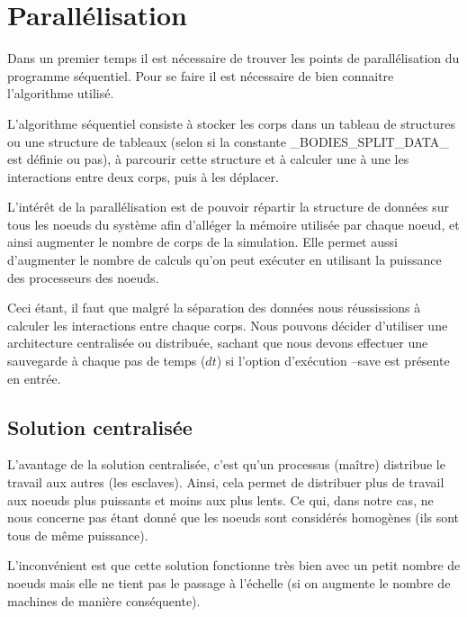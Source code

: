 \section{Parallélisation}

\par Dans un premier temps il est nécessaire de trouver les points de parallélisation 
du programme séquentiel. Pour se faire il est nécessaire de bien connaitre l'algorithme 
utilisé.\\
\par L'algorithme séquentiel consiste à stocker les corps dans un tableau de structures ou une structure 
de tableaux (selon si la constante \_BODIES\_SPLIT\_DATA\_ est définie ou pas), à parcourir 
cette structure et à calculer une à une les interactions entre deux corps, puis à les déplacer.\\

\par L'intérêt de la parallélisation est de pouvoir répartir la structure de données sur tous les
noeuds du système afin d'alléger la mémoire utilisée par chaque noeud, et ainsi augmenter le 
nombre de corps de la simulation. Elle permet aussi d'augmenter le nombre de calculs qu'on peut exécuter en 
utilisant la puissance des processeurs des noeuds.\\

\par Ceci étant, il faut que malgré la séparation des données nous réussissions à calculer
les interactions entre chaque corps. Nous pouvons décider d'utiliser une architecture centralisée 
ou distribuée, sachant que nous devons effectuer une sauvegarde à chaque pas de temps ($dt$) si l'option 
d'exécution --save est présente en entrée.\\

\subsection{Solution centralisée}
\par L'avantage de la solution centralisée, c'est qu'un processus (maître) distribue le travail aux autres
(les esclaves). Ainsi, cela permet de distribuer plus de travail aux noeuds plus puissants et moins aux
plus lents. Ce qui, dans notre cas, ne nous concerne pas étant donné que les noeuds sont considérés homogènes
(ils sont tous de même puissance).\\

\par L'inconvénient est que cette solution fonctionne très bien avec un petit nombre de noeuds 
mais elle ne tient pas le passage à l'échelle (si on augmente le nombre de machines 
de manière conséquente).\\

